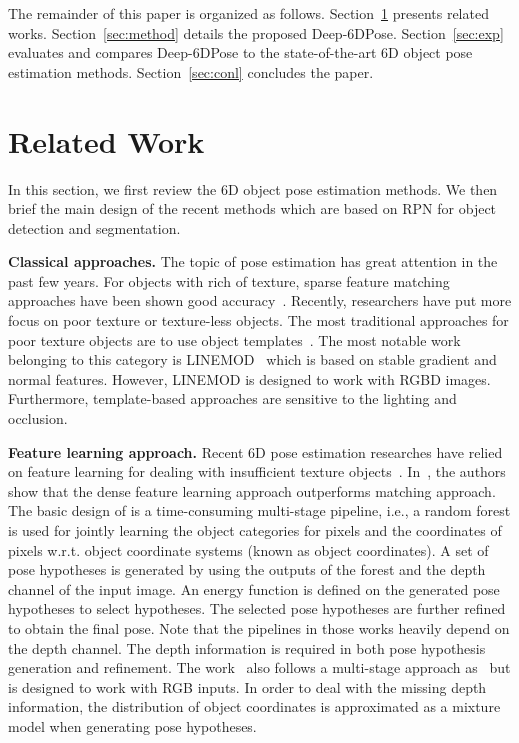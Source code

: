 \documentclass[conference]{IEEEtran}
\newcommand{\method}[1]{Deep-6DPose}
\begin{document}
The remainder of this paper is organized as follows. Section~\ref{sec:related} presents related works. Section~\ref{sec:method} details the proposed \method{}. Section~\ref{sec:exp} evaluates and compares \method{} to the state-of-the-art 6D object pose estimation methods. Section~\ref{sec:conl} concludes the paper. 

\section{Related Work}\label{sec:related}
In this section, we first review the 6D object pose estimation methods.  We then brief the main design of the recent methods which are based on RPN for object detection and segmentation.

\textbf{Classical approaches.} The topic of pose estimation has great attention in the past few years. For objects with rich of texture, sparse feature matching approaches have been shown good accuracy~\cite{DBLP:conf/clor/GordonL06,SIFT_Lowe,DBLP:conf/icra/MartinezCS10}. Recently, researchers have put more focus on poor texture or texture-less objects. The most traditional approaches for poor texture objects are to use object templates~\cite{ACCV12,DBLP:conf/eccv/TejaniTKK14,DBLP:conf/iccv/Rios-CabreraT13}. The most notable work belonging to this category is LINEMOD~\cite{ACCV12} which is based on stable gradient and normal features. However, LINEMOD is designed to work with RGBD images. Furthermore, template-based approaches are sensitive to the lighting and occlusion. 

\textbf{Feature learning approach.} Recent 6D pose estimation researches have relied on feature learning for dealing with insufficient texture objects~\cite{ECCV14,ICCV15,CVPR17,CVPR17_2}. In~\cite{ECCV14,ICCV15}, the authors show that the dense feature learning approach outperforms matching approach. The basic  design of \cite{ECCV14,ICCV15,CVPR17,CVPR17_2} is a time-consuming multi-stage pipeline, i.e., a random forest is used for jointly learning the object categories for pixels %
and the coordinates of pixels w.r.t. object coordinate systems (known as object coordinates). A set of pose hypotheses is generated by using the outputs of the forest and the depth channel of the input image. %
An energy function is defined on the generated pose hypotheses to select hypotheses. The selected pose hypotheses are further refined to obtain the final pose. Note that the pipelines in those works heavily depend on the depth channel. The depth information is required in both pose hypothesis generation and refinement. The work~\cite{CVPR16} also follows a multi-stage approach as~\cite{ECCV14,ICCV15} but is designed to work with RGB inputs. %
In order to deal with the missing depth information, the distribution of object coordinates is approximated as a mixture model when generating pose hypotheses. 
\end{document}
